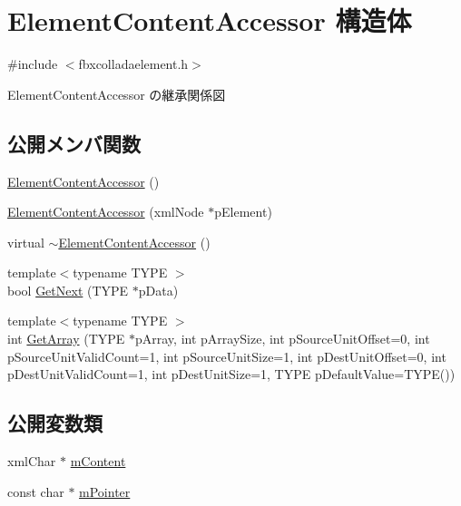\hypertarget{struct_element_content_accessor}{}\section{Element\+Content\+Accessor 構造体}
\label{struct_element_content_accessor}


{\ttfamily \#include $<$fbxcolladaelement.\+h$>$}



Element\+Content\+Accessor の継承関係図
\subsection*{公開メンバ関数}
\begin{DoxyCompactItemize}
\item 
\hyperlink{struct_element_content_accessor_a59a1e00643f9f94ff680d2f63f80b0cd}{Element\+Content\+Accessor} ()
\item 
\hyperlink{struct_element_content_accessor_af1a83e6fae2facae0b94d0c7332e0a2e}{Element\+Content\+Accessor} (xml\+Node $\ast$p\+Element)
\item 
virtual \hyperlink{struct_element_content_accessor_a269fa630fb13ff74aa591f53de51a976}{$\sim$\+Element\+Content\+Accessor} ()
\item 
{\footnotesize template$<$typename T\+Y\+PE $>$ }\\bool \hyperlink{struct_element_content_accessor_a5c066a3db4f929723fc1a78c11745154}{Get\+Next} (T\+Y\+PE $\ast$p\+Data)
\item 
{\footnotesize template$<$typename T\+Y\+PE $>$ }\\int \hyperlink{struct_element_content_accessor_a412f6cb46b068e160e393f4318bcf4fc}{Get\+Array} (T\+Y\+PE $\ast$p\+Array, int p\+Array\+Size, int p\+Source\+Unit\+Offset=0, int p\+Source\+Unit\+Valid\+Count=1, int p\+Source\+Unit\+Size=1, int p\+Dest\+Unit\+Offset=0, int p\+Dest\+Unit\+Valid\+Count=1, int p\+Dest\+Unit\+Size=1, T\+Y\+PE p\+Default\+Value=T\+Y\+PE())
\end{DoxyCompactItemize}
\subsection*{公開変数類}
\begin{DoxyCompactItemize}
\item 
xml\+Char $\ast$ \hyperlink{struct_element_content_accessor_a3b06ccf10e2deb2e1308bb5bc4bf9532}{m\+Content}
\item 
const char $\ast$ \hyperlink{struct_element_content_accessor_a086d33aecd0a61b63fb21ff4d744e463}{m\+Pointer}
\end{DoxyCompactItemize}


